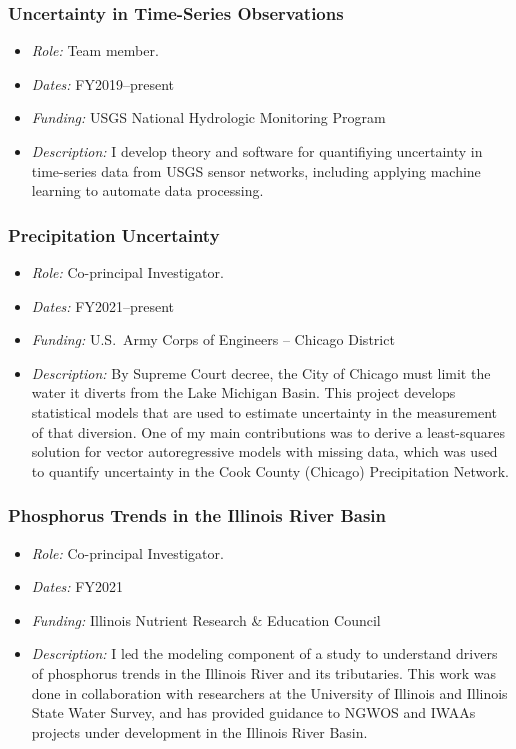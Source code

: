\documentclass[12pt]{article}
\begin{document}
\subsubsection{Uncertainty in Time-Series Observations} \label{TSUncertainty}

\begin{itemize}
\item \textit{Role:} Team member.
\item \textit{Dates:} FY2019--present
\item \textit{Funding:} USGS National Hydrologic Monitoring Program
\item \textit{Description:}
  I develop theory and software for quantifiying uncertainty in time-series data from USGS sensor networks,
  including applying machine learning to automate data processing.
\end{itemize}

\subsubsection{Precipitation Uncertainty} \label{precip}

\begin{itemize}
\item \textit{Role:} Co-principal Investigator.
\item \textit{Dates:} FY2021--present
\item \textit{Funding:} U.S.~Army Corps of Engineers -- Chicago District
\item \textit{Description:}
  By Supreme Court decree, the City of Chicago must limit the water it diverts from the Lake Michigan Basin.
  This project develops statistical models that are used to estimate uncertainty in the measurement of that diversion.
  One of my main contributions was to derive a least-squares solution for vector autoregressive models with missing data,
  which was used to quantify uncertainty in the Cook County (Chicago) Precipitation Network.
\end{itemize}


\subsubsection{Phosphorus Trends in the Illinois River Basin} \label{IRB-P-trends}

\begin{itemize}
\item \textit{Role:} Co-principal Investigator.
\item \textit{Dates:} FY2021
\item \textit{Funding:} Illinois Nutrient Research \& Education Council
\item \textit{Description:}
  I led the modeling component of a study to understand drivers of phosphorus trends in the Illinois River and its tributaries.
  This work was done in collaboration with researchers at the University of Illinois and Illinois State Water Survey,
  and has provided guidance to NGWOS and IWAAs projects under development in the Illinois River Basin.
\end{itemize}
\end{document}

